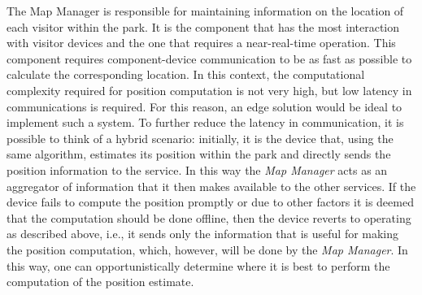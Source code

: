 The Map Manager is responsible for maintaining information on the location of each visitor within the park. It is the component that has the most
interaction with visitor devices and the one that requires a near-real-time operation. This component requires component-device communication to be
as fast as possible to calculate the corresponding location. In this context, the computational complexity required for position computation is not
very high, but low latency in communications is required. For this reason, an edge solution would be ideal to implement such a system. To further
reduce the latency in communication, it is possible to think of a hybrid scenario: initially, it is the device that, using the same algorithm,
estimates its position within the park and directly sends the position information to the service. In this way the \textit{Map Manager} acts as an
aggregator of information that it then makes available to the other services. If the device fails to compute the position promptly or due to other
factors it is deemed that the computation should be done offline, then the device reverts to operating as described above, i.e., it sends only the
information that is useful for making the position computation, which, however, will be done by the \textit{Map Manager}. In this way, one can
opportunistically determine where it is best to perform the computation of the position estimate.

